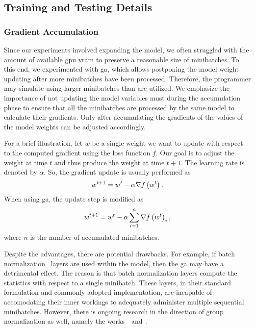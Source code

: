 \subsection{Training and Testing Details}

\subsubsection{Gradient Accumulation}

Since our experiments involved expanding the model, we often struggled with the amount of available \gls{gpu} \gls{vram} to preserve a reasonable size of minibatches. To this end, we experimented with \gls{ga}, which allows postponing the model weight updating after more minibatches have been processed. Therefore, the programmer may simulate using larger minibatches than are utilized. We emphasize the importance of not updating the model variables must during the accumulation phase to ensure that all the minibatches are processed by the same model to calculate their gradients. Only after accumulating the gradients of the values of the model weights can be adjusted accordingly.

For a brief illustration, let $w$ be a single weight we want to update with respect to the computed gradient using the loss function $f$. Our goal is to adjust the weight at time $t$ and thus produce the weight at time $t + 1$. The learning rate is denoted by $\alpha$. So, the gradient update is usually performed as
\begin{equation}
    w^{t + 1} = w^t - \alpha \nabla {f} \left( w^t \right).
\end{equation}
When using \gls{ga}, the update step is modified as
\begin{equation}
    w^{t + 1} = w^t - \alpha \sum_{i = 1}^{n} \nabla {f} \left( w^t \right)_i,
\end{equation}
where $n$ is the number of accumulated minibatches.

Despite the advantages, there are potential drawbacks. For example, if batch normalization~\cite{ioffe2015batchnorm} layers are used within the model, then the \gls{ga} may have a detrimental effect. The reason is that batch normalization layers compute the statistics with respect to a single minibatch. These layers, in their standard formulation and commonly adopted implementation, are incapable of accomodating their inner workings to adequately administer multiple sequential minibatches. However, there is ongoing research in the direction of group normalization as well, namely the works~\cite{wu2018groupnorm}~and~\cite{zhou2020batchgroupnorm}.

